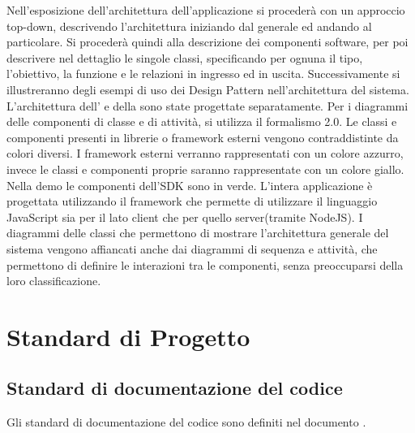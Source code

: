 Nell’esposizione dell’architettura dell’applicazione si procederà con
un approccio top-down, descrivendo l’architettura iniziando dal
generale ed andando al particolare. 
Si procederà quindi alla descrizione dei componenti software, per poi descrivere
nel dettaglio le singole classi, specificando per ognuna il tipo, l’obiettivo, la funzione e
le relazioni in ingresso ed in uscita.
Successivamente si illustreranno degli esempi di uso dei Design
Pattern nell’architettura del sistema. 
L'architettura dell'  e della  sono state progettate separatamente.  
Per i diagrammi delle componenti di classe e di attività, si utilizza
il formalismo  2.0. Le classi e componenti presenti in librerie o
framework esterni vengono contraddistinte da colori diversi. I
framework esterni verranno rappresentati con un colore azzurro, invece
le classi e componenti proprie saranno rappresentate con un
colore giallo. Nella demo le componenti dell'SDK sono in verde.
L'intera applicazione è progettata utilizzando il framework
 che permette di utilizzare il linguaggio JavaScript
sia per il lato client che per quello server(tramite NodeJS). 
I diagrammi delle classi che permettono di mostrare l’architettura
generale del sistema vengono affiancati anche dai diagrammi di
sequenza e attività, che permettono di definire le interazioni tra le
componenti, senza preoccuparsi della loro classificazione. 







\section{Standard di Progetto}

\subsection{Standard di documentazione del codice}
Gli standard di documentazione del codice sono definiti nel
documento  \emph{\normediprogetto} .

